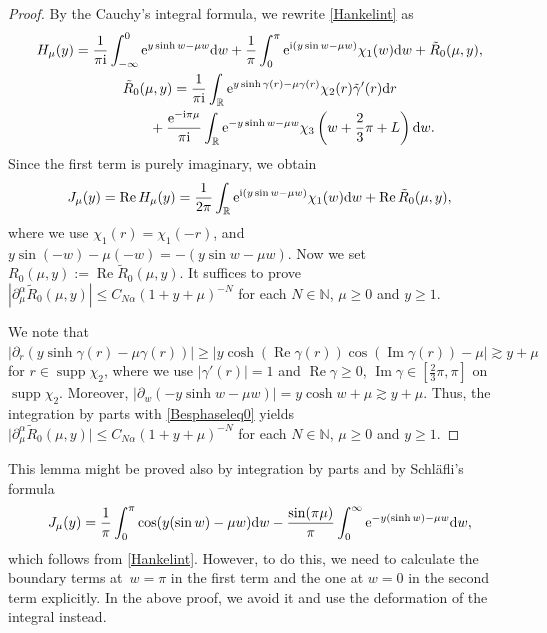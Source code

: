 \documentclass[pdftex]{sigma}
\numberwithin{equation}{section}
\def\R{\mathbb{R}}%
\DeclareMathOperator{\supp}{supp}%
\DeclareMathOperator{\re}{Re}%
\DeclareMathOperator{\im}{Im}%
\def\a{\alpha}
\def\c{\gamma}
\def\m{\mu}
\def\pa{\partial}
\begin{document}
\begin{proof}
By the Cauchy's integral formula, we rewrite \eqref{Hankelint} as
\begin{gather*}
H_{\m}(y)=\frac{1}{\pi {\rm i}}\int_{-\infty}^0{\rm e}^{y\sinh w-\m w}{\rm d}w+\frac{1}{\pi}\int_0^{\pi}{\rm e}^{{\rm i}(y\sin w-\m w)}\chi_1(w){\rm d}w+\tilde{R}_0(\m,y),\\
\tilde{R}_0(\m,y)=\frac{1}{\pi {\rm i}}\int_{\R}{\rm e}^{y\sinh \c(r)-\m \c(r)}\chi_2(r)\tilde{\c}'(r){\rm d}r\\
\phantom{\tilde{R}_0(\m,y)=}{}+\frac{{\rm e}^{-{\rm i}\pi\m}}{\pi {\rm i}}\int_{\R}{\rm e}^{-y\sinh w-\m w}\chi_3\left(w+\frac{2}{3}\pi+L\right){\rm d}w.
\end{gather*}
Since the first term is purely imaginary, we obtain
\begin{align*}
J_{\m}(y)=\re H_{\m}(y)=\frac{1}{2\pi}\int_{\R}{\rm e}^{{\rm i}(y\sin w-\m w)}\chi_1(w){\rm d}w+\re \tilde{R}_0(\m,y),
\end{align*}
where we use $\chi_1(r)=\chi_1(-r)$, \smash{$\supp \chi_1\subset \bigl(-\frac{3}{4}\pi,\frac{3}{4}\pi\bigr)$} and $y\sin(- w)-\m(-w)=-(y\sin w-\m w)$. Now we set $R_0(\m,y):=\re \tilde{R}_0(\m,y)$.
It suffices to prove $|\pa_{\m}^{\a}\tilde{R}_0(\m,y)|\leq C_{N\a}(1+y+\m)^{-N}$ for each $N\in\mathbb{N}$, $\m\geq 0$ and $y\geq 1$.

We note that $|\pa_r(y\sinh\c(r)-\m\c(r))|\geq |y\cosh (\re \c(r))\cos(\im \c(r))-\m|\gtrsim y+\m$ for $r\in \supp \chi_2$, where we use $|\c'(r)|=1$ and $\re\c\geq 0$, $\im \c\in [\frac{2}{3}\pi,\pi]$ on $\supp \chi_2$. Moreover, $|\pa_w(-y\sinh w-\m w)|=y\cosh w+\m \gtrsim y+\m$. Thus, the integration by parts with \eqref{Besphaseleq0} yields~${\big|\pa_{\m}^{\a}\tilde{R}_0(\m,y)\big|\leq C_{N\a}(1+y+\m)^{-N}}$ for each $N\in\mathbb{N}$, $\m\geq 0$ and $y\geq 1$.
\end{proof}

\begin{Remark}
This lemma might be proved also by integration by parts and by Schl\"afli's formula
\begin{align*}
J_{\m}(y)=\frac{1}{\pi}\int_0^{\pi}\cos (y(\sin w)-\m w){\rm d}w-\frac{\sin (\pi\m)}{\pi}\int_0^{\infty}{\rm e}^{-y(\sinh w)-\m w}{\rm d}w,
\end{align*}
which follows from \eqref{Hankelint}.
However, to do this, we need to calculate the boundary terms at~${w=\pi}$ in the first term and the one at $w=0$ in the second term explicitly. In the above proof, we avoid it and use the deformation of the integral instead.
\end{Remark}
\end{document}
